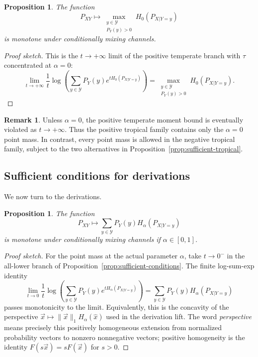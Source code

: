 \documentclass[aps,pra,11pt,onecolumn,nofootinbib,tightenlines]{revtex4-2}
\newtheorem{proposition}[theorem]{Proposition}
\theoremstyle{definition}
\newtheorem{remark}[theorem]{Remark}
\newcommand{\Y}{\mathcal{Y}}
\begin{document}
\begin{proposition}
\label{prop:sufficient-tropical-positive}
The function
\begin{equation}
P_{XY}\longmapsto
\max_{\substack{y\in\Y\\P_Y(y)>0}}H_0(P_{X|Y=y})
\end{equation}
is monotone under conditionally mixing channels.
\end{proposition}

\begin{proof}[Proof sketch]
This is the $t\to+\infty$ limit of the positive temperate branch with
$\tau$ concentrated at $\alpha=0$:
\begin{equation}
\lim_{t\to+\infty}\frac1t\log\!\left(
\sum_{y\in\Y}P_Y(y)e^{tH_0(P_{X|Y=y})}\right)
=\max_{\substack{y\in\Y\\P_Y(y)>0}}H_0(P_{X|Y=y}).
\end{equation}
\end{proof}

\begin{remark}
\label{rem:positive-tropical-endpoint}
Unless $\alpha=0$, the positive temperate moment bound is eventually violated as
$t\to+\infty$.  Thus the positive tropical family contains only the
$\alpha=0$ point mass.  In contrast, every point mass is allowed in the negative
tropical family, subject to the two alternatives in
Proposition~\ref{prop:sufficient-tropical}.
\end{remark}

\subsection{Sufficient conditions for derivations}

We now turn to the derivations.

\begin{proposition}
\label{prop:sufficient-derivations}
The function
\begin{equation}
P_{XY}\longmapsto
\sum_{y\in\Y}P_Y(y)H_\alpha(P_{X|Y=y})
\end{equation}
is monotone under conditionally mixing channels if $\alpha\in[0,1]$.
\end{proposition}

\begin{proof}[Proof sketch]
For the point mass at the actual parameter $\alpha$, take $t\to0^-$ in the
all-lower branch of Proposition~\ref{prop:sufficient-conditions}.  The finite
log-sum-exp identity
\begin{equation}
\lim_{t\to0}\frac1t\log\!\left(
\sum_{y\in\Y}P_Y(y)e^{tH_\alpha(P_{X|Y=y})}\right)
=\sum_{y\in\Y}P_Y(y)H_\alpha(P_{X|Y=y})
\end{equation}
passes monotonicity to the limit.  Equivalently, this is the concavity of the
perspective $\vec{x}\mapsto\|\vec{x}\|_1H_\alpha(\hat{x})$ used in the
derivation lift.
The word \emph{perspective} means precisely this positively homogeneous
extension from normalized probability vectors to nonzero nonnegative vectors;
positive homogeneity is the identity $F(s\vec{x})=sF(\vec{x})$ for $s>0$.
\end{proof}
\end{document}
